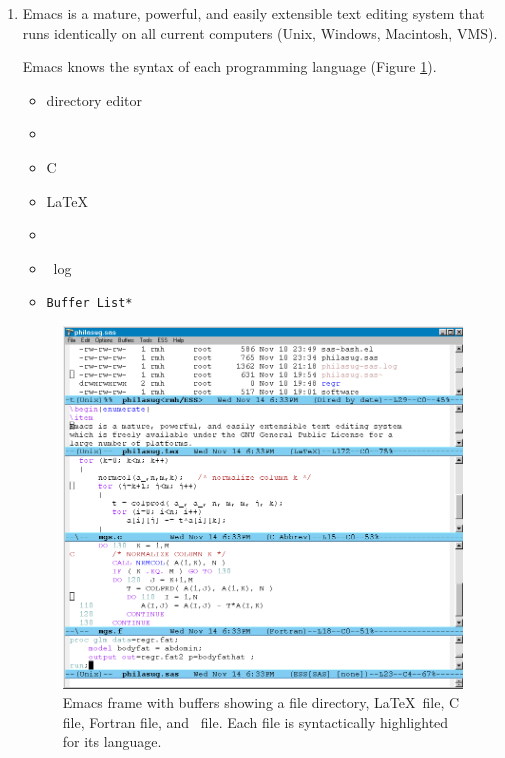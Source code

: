 \begin{enumerate}
\item
Emacs is a mature, powerful, and easily extensible text editing system
that runs identically on all current computers (Unix, Windows, Macintosh, VMS).

Emacs knows the syntax of each programming language (Figure \ref{Image3}).

\begin{itemize}
\item directory editor
\item \Fortran
\item C
\item \LaTeX
\item \SAS
\item \SAS\ log
\item {\tt *Buffer List*}
\end{itemize}



\begin{figure}[tbp]
\vspace*{-.25in}
\hspace*{1.25in}
  \includegraphics[angle=0,width=7.5in,natwidth=842,natheight=763]{Image3.png}
\vspace*{-.2in}
  \caption{Emacs frame with buffers showing a file directory,
\LaTeX\ file, C file, {\sc Fortran} file, and \SAS\ file.
Each file is syntactically highlighted for its language.}
  \label{Image3}
\end{figure}




\end{enumerate}
